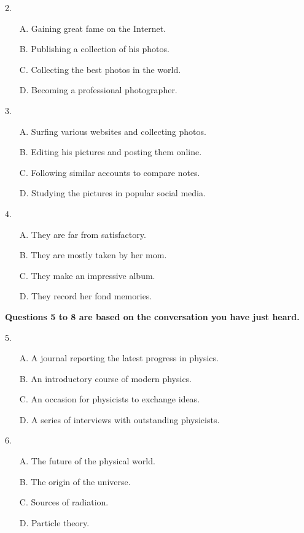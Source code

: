 \documentclass[UTF8,11pt]{ctexart}
\begin{document}
2.


\begin{itemize}[leftmargin=2em,itemsep=.2em,topsep=.4em]\item[A.] Gaining great fame on the Internet.
\item[B.] Publishing a collection of his photos.
\item[C.] Collecting the best photos in the world.
\item[D.] Becoming a professional photographer.
\end{itemize}

3.


\begin{itemize}[leftmargin=2em,itemsep=.2em,topsep=.4em]\item[A.] Surfing various websites and collecting photos.
\item[B.] Editing his pictures and posting them online.
\item[C.] Following similar accounts to compare notes.
\item[D.] Studying the pictures in popular social media.
\end{itemize}

4.


\begin{itemize}[leftmargin=2em,itemsep=.2em,topsep=.4em]\item[A.] They are far from satisfactory.
\item[B.] They are mostly taken by her mom.
\item[C.] They make an impressive album.
\item[D.] They record her fond memories.
\end{itemize}

\textbf{Questions 5 to 8 are based on the conversation you have just heard.}


5.


\begin{itemize}[leftmargin=2em,itemsep=.2em,topsep=.4em]\item[A.] A journal reporting the latest progress in physics.
\item[B.] An introductory course of modern physics.
\item[C.] An occasion for physicists to exchange ideas.
\item[D.] A series of interviews with outstanding physicists.
\end{itemize}

6.


\begin{itemize}[leftmargin=2em,itemsep=.2em,topsep=.4em]\item[A.] The future of the physical world.
\item[B.] The origin of the universe.
\item[C.] Sources of radiation.
\item[D.] Particle theory.
\end{itemize}
\end{document}
